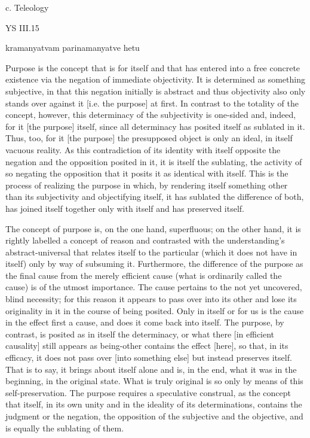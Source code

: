 c. Teleology

YS III.15

kramanyatvam parinamanyatve hetu

Purpose is the concept that is for itself and that has entered into
a free concrete existence via the negation of immediate objectivity.
It is determined as something subjective, in that this negation
initially is abstract and thus objectivity also only stands
over against it [i.e. the purpose] at first.
In contrast to the totality of the concept, however,
this determinacy of the subjectivity is one-sided and, indeed,
for it [the purpose] itself, since all determinacy has posited
itself as sublated in it.
Thus, too, for it [the purpose] the presupposed object is
only an ideal, in itself vacuous reality.
As this contradiction of its identity with itself opposite the negation and the
opposition posited in it, it is itself the sublating, the activity of so negating
the opposition that it posits it as identical with itself.
This is the process of realizing the purpose in which,
by rendering itself something other than its subjectivity and
objectifying itself, it has sublated the difference of both,
has joined itself together only with itself and has preserved itself.

The concept of purpose is, on the one hand, superfluous;
on the other hand, it is rightly labelled a concept of reason and
contrasted with the understanding's abstract-universal that
relates itself to the particular (which it does not have in itself)
only by way of subsuming it.
Furthermore, the difference of the purpose as the final cause
from the merely efficient cause (what is ordinarily called the cause)
is of the utmost importance.
The cause pertains to the not yet uncovered, blind necessity;
for this reason it appears to pass over into its other and
lose its originality in it in the course of being posited.
Only in itself or for us is the cause in the effect first a cause,
and does it come back into itself.
The purpose, by contrast, is posited as in itself the determinacy,
or what there [in efficient causality] still appears as being-other
contains the effect [here], so that, in its efficacy,
it does not pass over [into something else] but instead preserves itself.
That is to say, it brings about itself alone and is, in the end,
what it was in the beginning, in the original state.
What is truly original is so only by means of this self-preservation.
The purpose requires a speculative construal, as the concept that itself,
in its own unity and in the ideality of its determinations,
contains the judgment or the negation,
the opposition of the subjective and the objective,
and is equally the sublating of them.

